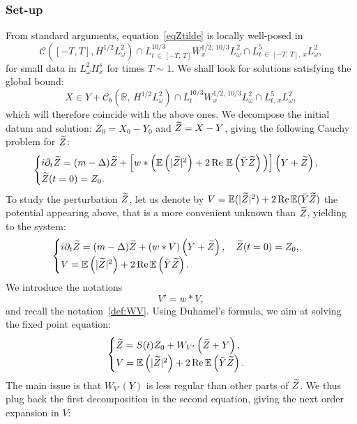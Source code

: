 \documentclass[AHL, Unicode, longabstracts,published]{cedram}
\newcommand{\R}{\mathbb{R}}
\newcommand{\E}{\mathbb{E}}
\DeclareMathOperator{\Rel}{Re}
\newcommand{\mclC}{\mathcal{C}}
\let\oldtilde\tilde
\renewcommand*{\tilde}[1]{\mathchoice{\widetilde{#1}}{\widetilde{#1}}{\oldtilde{#1}}{\oldtilde{#1}}}
\begin{document}
\subsubsection{Set-up}
From standard arguments, equation~\eqref{eqZtilde} is locally well-posed in
\begin{equation}\label{LWP}
\mclC\left([-T,T],H^{1/2}L^2_{\omega}\right) \cap L^{10/3}_{t\,\in\, [-T,\,T]}W^{1/2,\,10/3}_xL^2_\omega \cap L^5_{t\,\in\,[-T,\,T],\,x}L^2_\omega,
\end{equation}
for small data in $L^2_\omega H^s_x$ for times $T\sim 1$. We shall look for solutions satisfying the global bound:
\begin{equation} \label{def:spacegwp}
X\in Y + \mclC_b\left(\R,\,H^{1/2}L^2_{\omega}\right) \cap L^{10/3}_{t}W^{1/2,\,10/3}_xL^2_\omega \cap L^5_{t,\,x}L^2_\omega,
\end{equation} which will therefore coincide with the above ones. We decompose the initial datum and solution: $Z_0 = X_0 - Y_0$ and $\tilde Z = X-Y$, giving the following Cauchy problem for $\tilde Z$:
\begin{equation}\label{eqZtilde}
\begin{cases}
i\partial_t \tilde Z =(m -\Delta) \tilde Z +\left[w*\Big(\E\left(|\tilde Z|^2\right)+ 2\Rel\,\E\left(\bar Y \tilde Z\right) \Big)\right] \left(Y+\tilde Z\right), \\
\tilde Z(t=0) = Z_0.
\end{cases}
\end{equation}
To study the perturbation $\tilde Z$, let us denote by $V = \E(|\tilde Z|^2)+ 2\Rel \E(\bar Y \tilde Z)$ the potential appearing above, that is a more convenient unknown than $\tilde Z$, yielding to the system:
\[
\begin{cases}
i\partial_t \tilde Z =(m -\Delta) \tilde Z + (w*V) \left(Y+\tilde Z\right), \quad \tilde Z(t=0) = Z_0, \\
V = \E\left(|\tilde Z|^2\right)+ 2\Rel\E\left(\bar Y \tilde Z\right).
\end{cases}
\]
We introduce the notations
\[
V'=w*V,
\]
and recall the notation~\eqref{def:WV}. Using Duhamel's formula, we aim at solving the fixed point equation:
\[
\begin{cases}
\tilde Z = S(t) Z_0 + W_{V'}\left(\tilde Z+ Y\right),\\
V = \E\left(|\tilde Z|^2\right)+ 2\Rel\E\left(\bar Y \tilde Z\right).
\end{cases}
\]
The main issue is that $W_{V'}(Y)$ is less regular than other parts of $\tilde Z$. We thus plug back the first decomposition in the second equation, giving the next order expansion in $V$:
\end{document}
